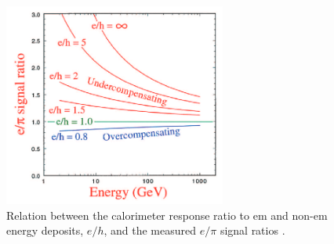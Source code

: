  \begin{figure}
	\centering
	\includegraphics[width=0.65\textwidth]{IMG/Cap2/compensation.png}
	\caption{Relation between the calorimeter response ratio to em and non-em energy deposits, $e/h$, and the measured $e/\pi$ signal ratios \cite{Wigmans_e_gamma}.}
	\label{fig:compensation}
\end{figure}

